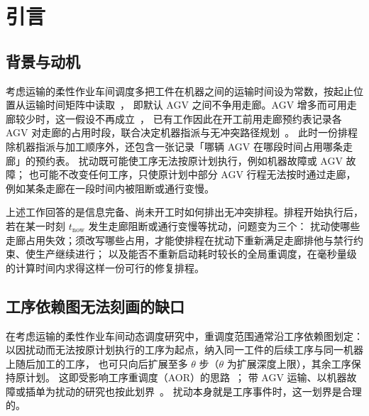 \documentclass[manuscript,screen,review]{acmart}
\begin{document}
\maketitle

\section{引言}
\label{sec:introduction}

\subsection{背景与动机}

考虑运输的柔性作业车间调度多把工件在机器之间的运输时间设为常数，按起止位置从运输时间矩阵中读取~\cite{xin2025review,meng2025cp,qin2026knowledge}，
即默认 AGV 之间不争用走廊。AGV 增多而可用走廊较少时，这一假设不再成立~\cite{kim2026congestion}，
已有工作因此在开工前用走廊预约表记录各 AGV 对走廊的占用时段，联合决定机器指派与无冲突路径规划~\cite{vanos2026exact,sun2023integrated,lyu2019approach,li2026framework}。
此时一份排程除机器指派与加工顺序外，还包含一张记录「哪辆 AGV 在哪段时间占用哪条走廊」的预约表。
扰动既可能使工序无法按原计划执行，例如机器故障或 AGV 故障；
也可能不改变任何工序，只使原计划中部分 AGV 行程无法按时通过走廊，例如某条走廊在一段时间内被阻断或通行变慢。

上述工作回答的是信息完备、尚未开工时如何排出无冲突排程。排程开始执行后，若在某一时刻 \(t_{\mathrm{now}}\) 发生走廊阻断或通行变慢等扰动，问题变为三个：
扰动使哪些走廊占用失效；须改写哪些占用，才能使排程在扰动下重新满足走廊排他与禁行约束、使生产继续进行；
以及能否不重新启动耗时较长的全局重调度，在毫秒量级的计算时间内求得这样一份可行的修复排程。

\subsection{工序依赖图无法刻画的缺口}

在考虑运输的柔性作业车间动态调度研究中，重调度范围通常沿工序依赖图划定：
以因扰动而无法按原计划执行的工序为起点，纳入同一工件的后续工序与同一机器上随后加工的工序，
也可只向后扩展至多 \(\theta\) 步（\(\theta\) 为扩展深度上限），其余工序保持原计划。
这即受影响工序重调度（AOR）的思路~\cite{subramaniam2003maor}；
带 AGV 运输、以机器故障或插单为扰动的研究也按此划界~\cite{zhang2023energy,tang2026dynamic}。
扰动本身就是工序事件时，这一划界是合理的。
\end{document}
